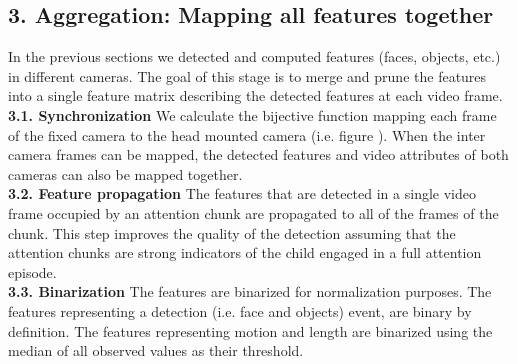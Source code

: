 \documentclass[10pt,letterpaper]{article}
\begin{document}
\subsection{3. Aggregation: Mapping all features together}
In the previous sections we detected and computed features (faces, objects, etc.) in different cameras. The goal of this stage is to merge and prune the features into a single feature matrix describing the detected features at each video frame.\\

{\bf 3.1. Synchronization} We calculate the bijective function mapping each frame of the fixed camera to the head mounted camera (i.e. figure \label{fig:main} ). When the inter camera frames can be mapped, the detected features and video attributes of both cameras can also be mapped together.\\

{\bf 3.2. Feature propagation} The features that are detected in a single video frame occupied by an attention chunk are propagated to all of the frames of the chunk. This step improves the quality of the detection assuming that the attention chunks are strong indicators of the child engaged in a full attention episode.\\

{\bf 3.3. Binarization} The features are binarized for normalization purposes. The features representing a detection (i.e. face and objects) event, are binary by definition. The features representing motion and length are binarized using the median of all observed values as their threshold.\\
\end{document}
